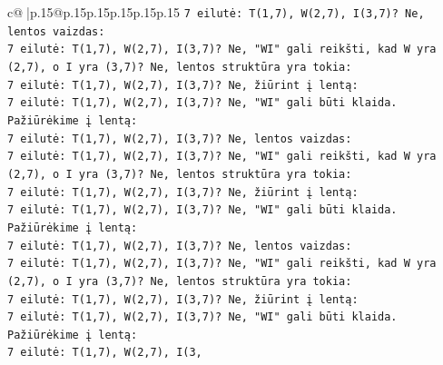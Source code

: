 \documentclass{article}
\begin{document}
{\begin{supertabular}{c@{$\;$}|p{.15\linewidth}@{}p{.15\linewidth}p{.15\linewidth}p{.15\linewidth}p{.15\linewidth}p{.15\linewidth}}
{{{\texttt{7 eilutė: T(1,7), W(2,7), I(3,7)? Ne, lentos vaizdas:} \\
\texttt{7 eilutė: T(1,7), W(2,7), I(3,7)? Ne, "WI" gali reikšti, kad W yra (2,7), o I yra (3,7)? Ne, lentos struktūra yra tokia:} \\
\texttt{7 eilutė: T(1,7), W(2,7), I(3,7)? Ne, žiūrint į lentą:} \\
\texttt{7 eilutė: T(1,7), W(2,7), I(3,7)? Ne, "WI" gali būti klaida.} \\
\texttt{Pažiūrėkime į lentą:} \\
\texttt{7 eilutė: T(1,7), W(2,7), I(3,7)? Ne, lentos vaizdas:} \\
\texttt{7 eilutė: T(1,7), W(2,7), I(3,7)? Ne, "WI" gali reikšti, kad W yra (2,7), o I yra (3,7)? Ne, lentos struktūra yra tokia:} \\
\texttt{7 eilutė: T(1,7), W(2,7), I(3,7)? Ne, žiūrint į lentą:} \\
\texttt{7 eilutė: T(1,7), W(2,7), I(3,7)? Ne, "WI" gali būti klaida.} \\
\texttt{Pažiūrėkime į lentą:} \\
\texttt{7 eilutė: T(1,7), W(2,7), I(3,7)? Ne, lentos vaizdas:} \\
\texttt{7 eilutė: T(1,7), W(2,7), I(3,7)? Ne, "WI" gali reikšti, kad W yra (2,7), o I yra (3,7)? Ne, lentos struktūra yra tokia:} \\
\texttt{7 eilutė: T(1,7), W(2,7), I(3,7)? Ne, žiūrint į lentą:} \\
\texttt{7 eilutė: T(1,7), W(2,7), I(3,7)? Ne, "WI" gali būti klaida.} \\
\texttt{Pažiūrėkime į lentą:} \\
\texttt{7 eilutė: T(1,7), W(2,7), I(3,} \\
            }
        }
    }
     \\ \\


\end{supertabular}}
\end{document}
